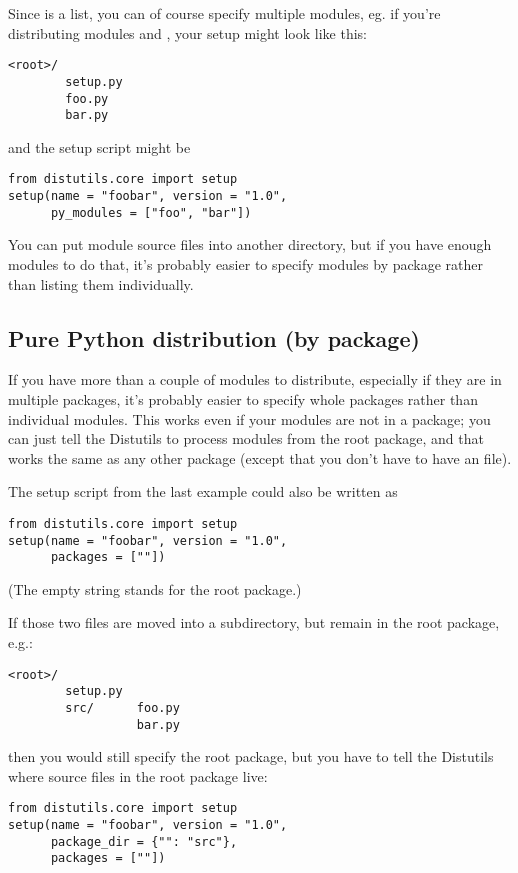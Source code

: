 \documentclass{howto}
\begin{document}
Since  is a list, you can of course specify multiple 
modules, eg. if you're distributing modules  and
, your setup might look like this:
\begin{verbatim}
<root>/
        setup.py
        foo.py
        bar.py
\end{verbatim}
and the setup script might be
\begin{verbatim}
from distutils.core import setup
setup(name = "foobar", version = "1.0",
      py_modules = ["foo", "bar"])
\end{verbatim}

You can put module source files into another directory, but if you have
enough modules to do that, it's probably easier to specify modules by
package rather than listing them individually.


\subsection{Pure Python distribution (by package)}
\label{pure-pkg}

If you have more than a couple of modules to distribute, especially if
they are in multiple packages, it's probably easier to specify whole
packages rather than individual modules.  This works even if your
modules are not in a package; you can just tell the Distutils to process
modules from the root package, and that works the same as any other
package (except that you don't have to have an 
file).

The setup script from the last example could also be written as
\begin{verbatim}
from distutils.core import setup
setup(name = "foobar", version = "1.0",
      packages = [""])
\end{verbatim}
(The empty string stands for the root package.)

If those two files are moved into a subdirectory, but remain in the root
package, e.g.:
\begin{verbatim}
<root>/
        setup.py
        src/      foo.py
                  bar.py
\end{verbatim}
then you would still specify the root package, but you have to tell the
Distutils where source files in the root package live:
\begin{verbatim}
from distutils.core import setup
setup(name = "foobar", version = "1.0",
      package_dir = {"": "src"},
      packages = [""])
\end{verbatim}
\end{document}
